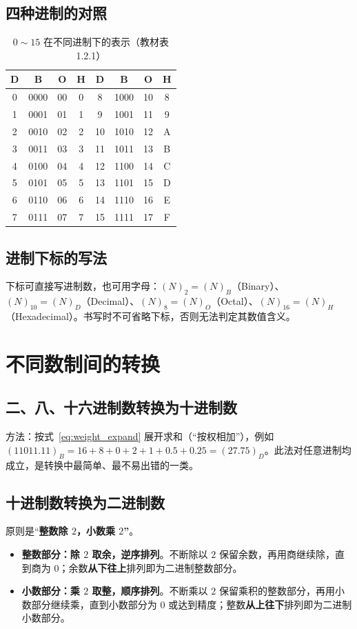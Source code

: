 \subsection{四种进制的对照}
\begin{table}[!htbp]
    \centering
    \caption{$0\sim15$ 在不同进制下的表示（教材表 1.2.1）}
    \label{tab:num016}
    \begin{tabular}{@{}cccc@{\hspace{2em}}cccc@{}}
        \toprule
        D & B & O & H & D & B & O & H \\
        \midrule
        0  & 0000 & 00 & 0 & 8  & 1000 & 10 & 8 \\
        1  & 0001 & 01 & 1 & 9  & 1001 & 11 & 9 \\
        2  & 0010 & 02 & 2 & 10 & 1010 & 12 & A \\
        3  & 0011 & 03 & 3 & 11 & 1011 & 13 & B \\
        4  & 0100 & 04 & 4 & 12 & 1100 & 14 & C \\
        5  & 0101 & 05 & 5 & 13 & 1101 & 15 & D \\
        6  & 0110 & 06 & 6 & 14 & 1110 & 16 & E \\
        7  & 0111 & 07 & 7 & 15 & 1111 & 17 & F \\
        \bottomrule
    \end{tabular}
\end{table}

\subsection{进制下标的写法}
下标可直接写进制数，也可用字母：$(N)_2=(N)_B$（Binary）、$(N)_{10}=(N)_D$（Decimal）、$(N)_8=(N)_O$（Octal）、$(N)_{16}=(N)_H$（Hexadecimal）。书写时不可省略下标，否则无法判定其数值含义。

\section{不同数制间的转换}
\subsection{二、八、十六进制数转换为十进制数}
方法：按式~\eqref{eq:weight_expand} 展开求和（``按权相加''），例如 $(11011.11)_B=16+8+0+2+1+0.5+0.25=(27.75)_D$。此法对任意进制均成立，是转换中最简单、最不易出错的一类。

\subsection{十进制数转换为二进制数}
原则是``\textbf{整数除 $2$，小数乘 $2$''}。
\begin{itemize}
    \item \textbf{整数部分：除 $2$ 取余，逆序排列}。不断除以 $2$ 保留余数，再用商继续除，直到商为 $0$；余数\textbf{从下往上}排列即为二进制整数部分。
    \item \textbf{小数部分：乘 $2$ 取整，顺序排列}。不断乘以 $2$ 保留乘积的整数部分，再用小数部分继续乘，直到小数部分为 $0$ 或达到精度；整数\textbf{从上往下}排列即为二进制小数部分。
\end{itemize}

